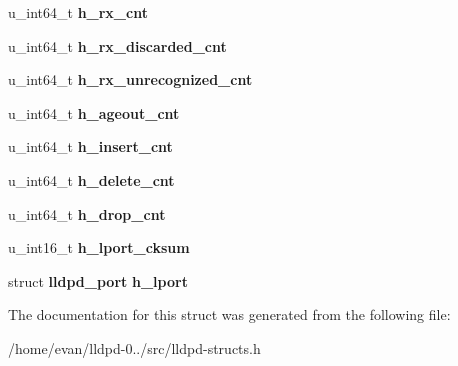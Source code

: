 \begin{DoxyCompactItemize}
\item 
u\-\_\-int64\-\_\-t {\bfseries h\-\_\-rx\-\_\-cnt}\label{structlldpd__hardware_a26b199c761e5c1c282c1137fd14c4bf8}

\item 
u\-\_\-int64\-\_\-t {\bfseries h\-\_\-rx\-\_\-discarded\-\_\-cnt}\label{structlldpd__hardware_a91bbd9a5913578615d83e1850557a877}

\item 
u\-\_\-int64\-\_\-t {\bfseries h\-\_\-rx\-\_\-unrecognized\-\_\-cnt}\label{structlldpd__hardware_a94a31eeb9369fc961dc2e38bb12ca331}

\item 
u\-\_\-int64\-\_\-t {\bfseries h\-\_\-ageout\-\_\-cnt}\label{structlldpd__hardware_ac9c114b2c3dabf8168405a17d9080438}

\item 
u\-\_\-int64\-\_\-t {\bfseries h\-\_\-insert\-\_\-cnt}\label{structlldpd__hardware_a1f6815f2d7eefa87affbe2cdd3342373}

\item 
u\-\_\-int64\-\_\-t {\bfseries h\-\_\-delete\-\_\-cnt}\label{structlldpd__hardware_ac1c0a27d0b401238007d09e44607f2e8}

\item 
u\-\_\-int64\-\_\-t {\bfseries h\-\_\-drop\-\_\-cnt}\label{structlldpd__hardware_aa906249b5bbb870932483384f549f128}

\item 
u\-\_\-int16\-\_\-t {\bfseries h\-\_\-lport\-\_\-cksum}\label{structlldpd__hardware_a9c54687b09eddd494cd104cdd3c62d69}

\item 
struct {\bf lldpd\-\_\-port} {\bfseries h\-\_\-lport}\label{structlldpd__hardware_a293ba4b91ac28baa4fbeb8e04a88f565}

\end{DoxyCompactItemize}


\-The documentation for this struct was generated from the following file\-:\begin{DoxyCompactItemize}
\item 
/home/evan/lldpd-\/0../src/lldpd-\/structs.\-h\end{DoxyCompactItemize}
